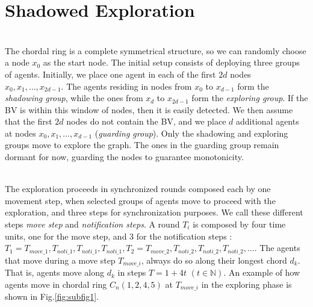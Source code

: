 \section{Shadowed Exploration}
\\
The chordal ring is a complete symmetrical structure, so we can randomly choose a node $x_0$ as the start node.  The initial setup consists of deploying three groups of agents.
Initially, we place one  agent in each of the first $2d$ nodes   $x_0, x_1, \ldots , x_{2d-1}$. 
The agents residing in nodes from $x_0$ to $x_{d-1}$ form the  {\em shadowing group}, while the ones from $x_d$ to $x_{2d-1}$ form the {\em exploring group}. 
If the BV is within this window of nodes, then it is easily detected. We then assume that the  first $2d$ nodes do not contain the BV, and we place $d$ additional agents at nodes $x_ 0,x_1, \ldots, x_{d-1}$ ({\em guarding group}). 
Only the shadowing and exploring groups move to explore the graph. The ones in the guarding group remain dormant for now, guarding the nodes to guarantee monotonicity. 

\\
The exploration proceeds in synchronized rounds composed each by  one movement step, when selected groups of agents move to proceed with the exploration, and three steps for synchronization purposes. We call these different steps    {\em move step}  and  {\em notification steps}. A round $T_i$ is composed by four time units, one for the move step, and 3 for the notification steps : 
$T_1 = T_{move\_1},T_{noti\_1},T_{noti\_1},T_{noti\_1},  
T_2 =  T_{move\_2},T_{noti\_2},T_{noti\_2},T_{noti\_2}, \ldots$.
% 
%
%
The agents that move during a move step $T_{move\_i}$, always do so along their longest chord $d_k$. That is, agents move along $d_k$ in steps $T=1+4t$ $(t\in \mathbb{N})$.  
An example of how agents move in chordal ring $C_n(1, 2 , 4, 5)$ at $T_{move\_i}$ in the  exploring phase is shown in Fig.\ref{fig:subfig1}. \\

